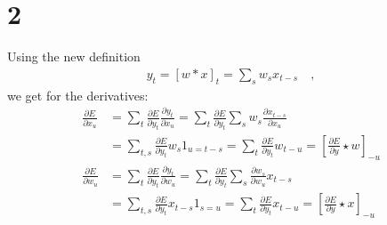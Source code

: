\section*{2}
Using the new definition
\begin{align*}
	y_t = [w * x]_t = \sum_s w_s x_{t-s}\quad ,
\end{align*}
we get for the derivatives:
\begin{align*}
	\frac{\partial E}{\partial x_u} 
	&= \sum_t \frac{\partial E}{\partial y_t} \frac{\partial y_t}{\partial x_u}
	= \sum_t \frac{\partial E}{\partial y_t} \sum_s w_s \frac{\partial x_{t-s}}{\partial x_u}\\
	&= \sum_{t,s} \frac{\partial E}{\partial y_t} w_s 1_{u=t-s}
	= \sum_t \frac{\partial E}{\partial y_t} w_{t-u} = \left[\frac{\partial E}{\partial y} \star w\right]_{-u}\\
	\frac{\partial E}{\partial w_u} 
	&= \sum_t \frac{\partial E}{\partial y_t} \frac{\partial y_t}{\partial w_u}
	= \sum_t \frac{\partial E}{\partial y_t} \sum_s \frac{\partial w_s}{\partial w_u} x_{t-s}\\
	&= \sum_{t,s} \frac{\partial E}{\partial y_t} x_{t-s} 1_{s=u}
	= \sum_t \frac{\partial E}{\partial y_t} x_{t-u} 
	= \left[\frac{\partial E}{\partial y} \star x\right]_{-u}
\end{align*}